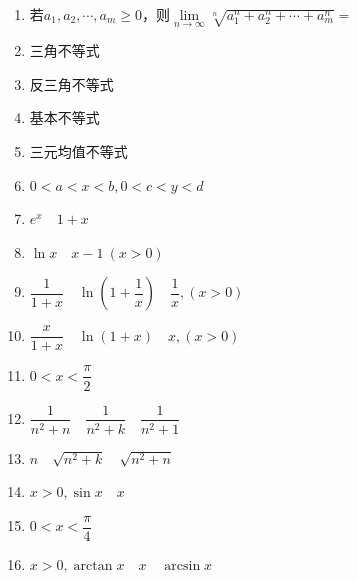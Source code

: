 \documentclass[a4paper,12pt]{article}
\begin{document}
    \newpage

    \begin{enumerate}
        \item 若$a_1, a_2, \cdots, a_m \ge 0$，则$\lim\limits_{n\to\infty} \sqrt[n]{a_1^n + a_2^n + \cdots + a_m^n} =$
    \end{enumerate}

    \begin{minipage}[t]{0.40\textwidth}
        \begin{enumerate}[leftmargin=*, itemsep=1.1em]
            \setcounter{enumi}{1}
            \item 三角不等式
            \item 反三角不等式
            \item 基本不等式
            \item 三元均值不等式
            \item $0 < a < x < b, 0 < c < y < d$
            \item $e^x \quad 1+x$
            \item $\ln x\quad x-1\ (x>0)$
            \item $\dfrac{1}{1+x} \quad \ln\!\left(1+\dfrac1x\right)\quad \dfrac{1}{x}, (x>0)$
        \end{enumerate}
    \end{minipage}
    \hfill
    \begin{minipage}[t]{0.46\textwidth}
        \begin{enumerate}[leftmargin=*, itemsep=1.1em]
            \setcounter{enumi}{9}
            \item $\dfrac{x}{1+x}\quad\ln(1+x)\quad x, (x>0)$
            \item $0<x<\dfrac{\pi}{2}$
            \item $\dfrac{1}{n^2+n} \quad \dfrac{1}{n^2+k} \quad \dfrac{1}{n^2+1}$
            \item $n \quad \sqrt{n^2+k} \quad \sqrt{n^2+n}$
            \item $x > 0, \sin x \quad x$
            \item $0 < x < \dfrac{\pi}{4}$
            \item $x>0, \arctan x\quad x \quad \arcsin x$
        \end{enumerate}
    \end{minipage}
\end{document}
